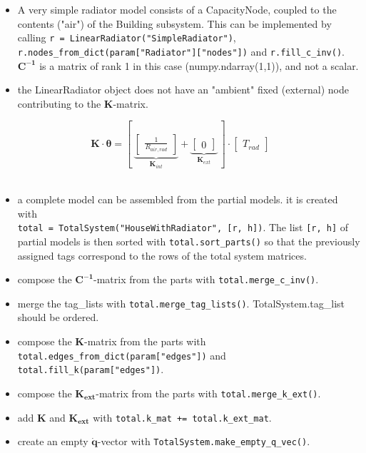 \begin{itemize}
	\item  A very simple radiator model consists of a CapacityNode, coupled to the contents ("air") of the Building subsystem. This can be implemented by calling \texttt{r = LinearRadiator("SimpleRadiator")}, \\
	\texttt{r.nodes\_from\_dict(param["Radiator"]["nodes"])} and \texttt{r.fill\_c\_inv()}. $\mathbf{C^{-1}}$ is a matrix of rank 1 in this case (numpy.ndarray(1,1)), and not a scalar.
	\item the LinearRadiator object does not have an "ambient" fixed (external) node contributing to the $\mathbf{K}$-matrix.
\end{itemize}

	\begin{equation}
	\mathbf{K} \cdot \boldsymbol{\theta} =
	\left[~
	\underbrace{
		\begin{bmatrix}
			\frac{1}{R_{air, rad}} 
		\end{bmatrix}
	}_{\mathbf{K}_{int}}
	+
	\underbrace{
		\begin{bmatrix}
			0
		\end{bmatrix}
	}_{\mathbf{K}_{ext}}
	~\right]
	\cdot
	\begin{bmatrix}
		T_{rad}
	\end{bmatrix}
\end{equation}
\\
\begin{itemize}
	\item a complete model can be assembled from the partial models. it is created with \\ \texttt{total = TotalSystem("HouseWithRadiator", [r, h])}. The list \texttt{[r, h]} of partial models is then sorted with     \texttt{total.sort\_parts()} so that the previously assigned tags correspond to the rows of the total system matrices.
	\item compose the $\mathbf{C^{-1}}$-matrix from the parts with \texttt{total.merge\_c\_inv()}.
	\item merge the tag\_lists with \texttt{total.merge\_tag\_lists()}. TotalSystem.tag\_list should be ordered.
	
	\item compose the $\mathbf{K}$-matrix from the parts with \texttt{total.edges\_from\_dict(param["edges"])} and \\ \texttt{total.fill\_k(param["edges"])}.
	\item compose the $\mathbf{K_{ext}}$-matrix from the parts with \texttt{total.merge\_k\_ext()}.
	\item add $\mathbf{K}$ and $\mathbf{K_{ext}}$ with \texttt{total.k\_mat += total.k\_ext\_mat}.
	
	\item create an empty $\mathbf{\dot{q}}$-vector with \texttt{TotalSystem.make\_empty\_q\_vec()}.
\end{itemize}

